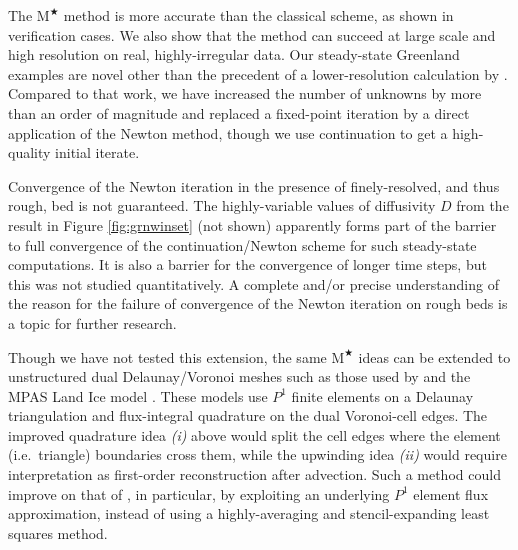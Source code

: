 \documentclass[twocolumn,a4paper]{igs}
\newcommand{\Mstar}{$\text{M}^{\bigstar}$\xspace}
\begin{document}
The \Mstar method is more accurate than the classical scheme, as shown in verification cases.  We also show that the method can succeed at large scale and high resolution on real, highly-irregular data.  Our steady-state Greenland examples are novel other than the precedent of a lower-resolution calculation by \cite{JouvetBueler2012}.  Compared to that work, we have increased the number of unknowns by more than an order of magnitude and replaced a fixed-point iteration by a direct application of the Newton method, though we use continuation to get a high-quality initial iterate.

Convergence of the Newton iteration in the presence of finely-resolved, and thus rough, bed is not guaranteed.  The highly-variable values of diffusivity $D$ from the result in Figure \ref{fig:grnwinset} (not shown) apparently forms part of the barrier to full convergence of the continuation/Newton scheme for such steady-state computations.  It is also a barrier for the convergence of longer time steps, but this was not studied quantitatively.  A complete and/or precise understanding of the reason for the failure of convergence of the Newton iteration on rough beds is a topic for further research.

Though we have not tested this extension, the same \Mstar ideas can be extended to unstructured dual Delaunay/Voronoi meshes such as those used by \cite{EgholmNielsen2010} and the MPAS Land Ice model \citep{MPASLandIce2013,Ringleretal2013}.  These models use $P^1$ finite elements on a Delaunay triangulation and flux-integral quadrature on the dual Voronoi-cell edges.  The improved quadrature idea \emph{(i)} above would split the cell edges where the element (i.e.~triangle) boundaries cross them, while the upwinding idea \emph{(ii)} would require interpretation as first-order reconstruction after advection.  Such a method could improve on that of \cite{EgholmNielsen2010}, in particular, by exploiting an underlying $P^1$ element flux approximation, instead of using a highly-averaging and stencil-expanding least squares method.
\end{document}
